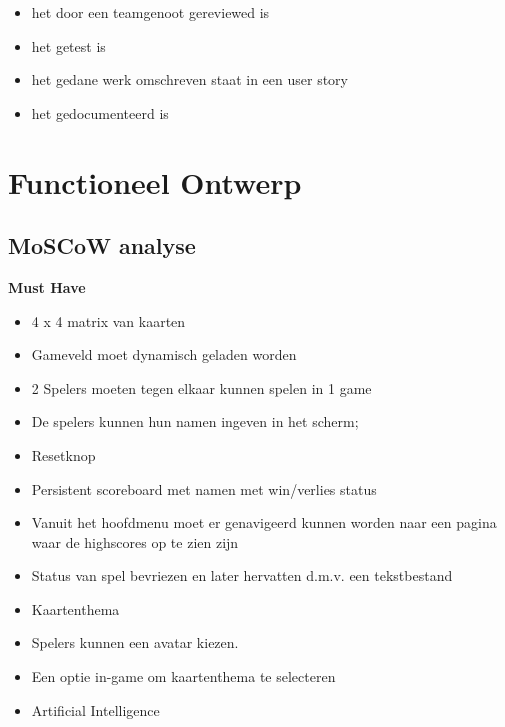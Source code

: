 \documentclass[a4paper,titlepage,11pt]{article}
\begin{document}
\begin{itemize}

\item het door een teamgenoot gereviewed is
\item het getest is
\item het gedane werk omschreven staat in een user story
\item het gedocumenteerd is
\end{itemize}

\clearpage

\section{Functioneel Ontwerp}

\subsection{MoSCoW analyse}

{\bf Must Have}

\begin{itemize}
\item 4 x 4 matrix van kaarten
\item Gameveld moet dynamisch geladen worden
\item 2 Spelers moeten tegen elkaar kunnen spelen in 1 game
\item De spelers kunnen hun namen ingeven in het scherm;
\item Resetknop
\item Persistent scoreboard met namen met win/verlies status
\item Vanuit het hoofdmenu moet er genavigeerd kunnen worden naar een pagina waar de 
  highscores op te zien zijn
\item Status van spel bevriezen en later hervatten d.m.v. een tekstbestand
\end{itemize}

\begin{itemize}
\item Kaartenthema
\end{itemize}
\begin{itemize}
\item Spelers kunnen een avatar kiezen.
\end{itemize}
\begin{itemize}
\item Een optie in-game om kaartenthema te selecteren
\item Artificial Intelligence
\end{itemize}
\end{document}
